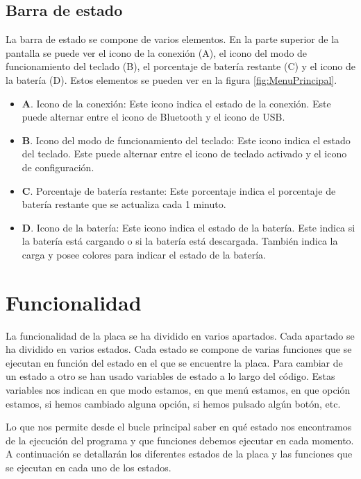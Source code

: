 \subsection{Barra de estado}

La barra de estado se compone de varios elementos. En la parte superior de la pantalla se puede ver el icono de la conexión (A), el icono del modo de funcionamiento del teclado (B), el porcentaje de batería restante (C) y el icono de la batería (D). Estos elementos se pueden ver en la figura \ref{fig:MenuPrincipal}.

\begin{itemize}
    \item \textbf{A}. Icono de la conexión: Este icono indica el estado de la conexión. Este puede alternar entre el icono de Bluetooth y el icono de USB.
    \item \textbf{B}. Icono del modo de funcionamiento del teclado: Este icono indica el estado del teclado. Este puede alternar entre el icono de teclado activado y el icono de configuración.
    \item \textbf{C}. Porcentaje de batería restante: Este porcentaje indica el porcentaje de batería restante que se actualiza cada 1 minuto.
    \item \textbf{D}. Icono de la batería: Este icono indica el estado de la batería. Este indica si la batería está cargando o si la batería está descargada. También indica la carga y posee colores para indicar el estado de la batería.
\end{itemize}

\section{Funcionalidad}

La funcionalidad de la placa se ha dividido en varios apartados. Cada apartado se ha dividido en varios estados. Cada estado se compone de varias funciones que se ejecutan en función del estado en el que se encuentre la placa. Para cambiar de un estado a otro se han usado variables de estado a lo largo del código. Estas variables nos indican en que modo estamos, en que menú estamos, en que opción estamos, si hemos cambiado alguna opción, si hemos pulsado algún botón, etc.

Lo que nos permite desde el bucle principal saber en qué estado nos encontramos de la ejecución del programa y que funciones debemos ejecutar en cada momento. A continuación se detallarán los diferentes estados de la placa y las funciones que se ejecutan en cada uno de los estados.

